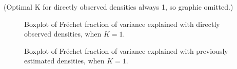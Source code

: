 (Optimal K for directly observed densities always 1, so graphic omitted.)

\begin{figure}[h]
    \centering
    \resizebox{0.9\textwidth}{!}{}
    \caption[Simulation results: boxplots fve --- observed densities]{Boxplot of
    Fréchet fraction of variance explained with directly observed
    densities, when $K = 1$.}
    \label{fig:sim_fve}
\end{figure}

\begin{figure}[h]
    \centering
    \resizebox{0.9\textwidth}{!}{}
    \caption[Simulation results: boxplots fve --- estimated densities]{Boxplot of
    Fréchet fraction of variance explained with previously estimated densities, when
    $K = 1$.}
    \label{fig:sim_fve_denstimation}
\end{figure}




















